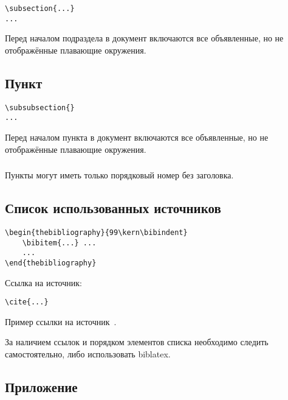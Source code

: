 \documentclass[14pt, a4paper, titlepage]{extarticle}
\begin{document}
\begin{verbatim}
\subsection{...}
...
\end{verbatim}

Перед началом подраздела в документ включаются все объявленные, но не отображённые плавающие окружения.

\subsection{Пункт}

\begin{verbatim}
\subsubsection{}
...
\end{verbatim}

Перед началом пункта в документ включаются все объявленные, но не отображённые плавающие окружения.

\subsubsection{}

Пункты могут иметь только порядковый номер без заголовка.


\subsection{Список использованных источников}

\begin{verbatim}
\begin{thebibliography}{99\kern\bibindent}
    \bibitem{...} ...
    ...
\end{thebibliography}
\end{verbatim}

Ссылка на источник:
\begin{verbatim}
\cite{...}
\end{verbatim}

Пример ссылки на источник~\cite{bib:recomendations}.

За наличием ссылок и порядком элементов списка необходимо следить самостоятельно, либо использовать biblatex.


\subsection{Приложение}
\end{document}
